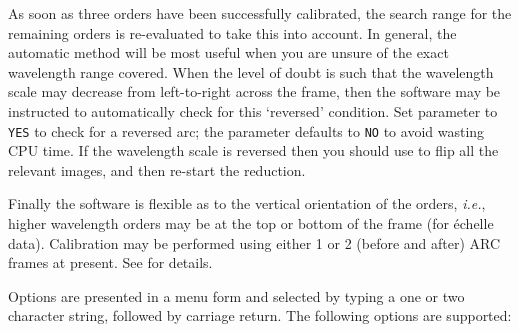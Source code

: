 As soon as three orders have been successfully calibrated, the search range
for the remaining orders is re-evaluated to take this into account.
In general, the automatic method will be most useful when you are unsure of
the exact wavelength range covered.  When the level of doubt is such that
the wavelength scale may decrease from left-to-right across the frame, then
the software may be instructed to automatically check for this `reversed'
condition.
Set parameter  to \verb+YES+
to check for a reversed arc; the parameter defaults to \verb+NO+ to avoid
wasting CPU time.
If the wavelength scale is reversed then you should use
 to flip all the relevant images, and then re-start
the reduction.

Finally the software is flexible as to the vertical orientation of the
orders, {\it{i.e.}}, higher wavelength orders may be at the top or bottom
of the frame (for \'{e}chelle data).
Calibration may be performed using either 1 or 2 (before and after) ARC
frames at present.  See \sunspec{\S\ref{arc_frames}}
{} for details.

Options are presented in a menu form and selected by typing a one or two
character string, followed by carriage return.  The following options are
supported:

